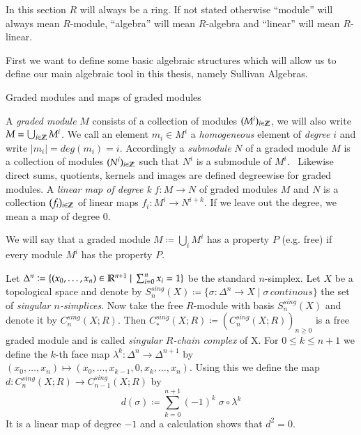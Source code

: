 In this section $R$ will always be a ring. If not stated otherwise ``module'' will
always mean $R$-module, ``algebra'' will mean $R$-algebra and ``linear'' will mean $R$-linear.

First we want to define some basic algebraic structures which will allow us to define our main algebraic tool
in this thesis, namely Sullivan Algebras.

\begin{Definition}{Graded modules and maps of graded modules}

A \emph{graded module} $M$ consists of a collection of modules $(M^i)_{i \in \mathbb{Z}}$, we will also write
$M = \bigcup_{i \in \mathbb{Z}} M^i$. We call an element 
$m_i \in M^i$ a \emph{homogeneous} element of \emph{degree} $i$ and write $|m_i| = deg (m_i) = i$. Accordingly a \emph{submodule} $N$ of
a graded module $M$ is a collection of modules $(N^i)_{i \in \mathbb{Z}}$ such that $N^i$ is a submodule of $M^i$. \
Likewise direct sums, quotients, kernels and images are defined degreewise for graded modules. \newline
A \emph{linear map of degree k} $f \colon M \to N$ of graded modules $M$ and $N$ is a collection $(f_i)_{i \in \mathbb{Z}}$ of
linear maps $f_i \colon M^i \to N^{i + k}$. If we leave out the degree, we mean a map of degree $0$.
\end{Definition}

We will say that a graded module $M \coloneqq \bigcup_i M^i$ has a property $P$ (e.g. free) if every module $M^i$ has the property $P$.
 
\begin{Example}
\label{ex:SingularChainComplex}
 Let $\Delta^n \coloneqq {\lbrace (x_0, \dotsc , x_n) \in \mathbb{R}^{n+1} \; | \; \sum_{i = 0}^n x_i = 1\rbrace}$ be the standard
 $n$-simplex. Let $X$ be a topological space and denote by
 $S_n^{sing}(X) \coloneqq {\lbrace \sigma \colon \Delta^n \to X \; | \; \sigma \, continous \rbrace}$ the set of
 \emph{singular $n$-simplices}. 
 Now take the free $R$-module with basis $S_n^{sing}(X)$ 
 and denote it by $C_n^{sing}(X;R)$.
 Then $ C_*^{sing}(X;R) \coloneqq (C_n^{sing}(X;R))_{n \geq 0}$ is a free graded module and is called 
 \emph{singular $R$-chain complex} of X. \newline
 For $0 \leq k \leq n+1$ we define the $k$-th face map $\lambda^k \colon \Delta^{n} \to \Delta^{n+1}$ by
 $(x_0, \dotsc, x_n) \mapsto (x_0, \dotsc, x_{k-1},0, x_k, \dotsc, x_n)$.
 Using this we define the map $d \colon C_n^{sing}(X;R) \to C_{n-1}^{sing}(X;R)$ by
 $$ d(\sigma) \coloneqq \sum_{k = 0}^{n+1} (-1)^k \; \sigma \circ \lambda^k$$
 It is a linear map of degree $-1$ and a calculation shows that $d^2 = 0$.
 \end{Example}


